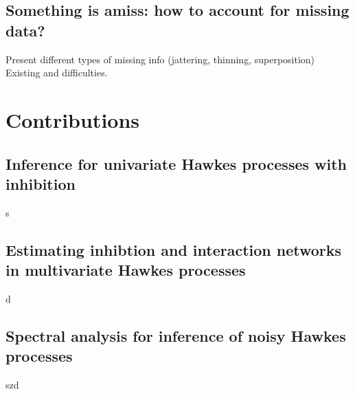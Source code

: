     \subsection{Something is amiss: how to account for missing data?}
        Present different types of missing info (jattering, thinning, superposition)
        Existing and difficulties.


\section{Contributions}
    \subsection{Inference for univariate Hawkes processes with inhibition}
        s
    \subsection{Estimating inhibtion and interaction networks in multivariate Hawkes processes}
        d
    \subsection{Spectral analysis for inference of noisy Hawkes processes}
        szd




